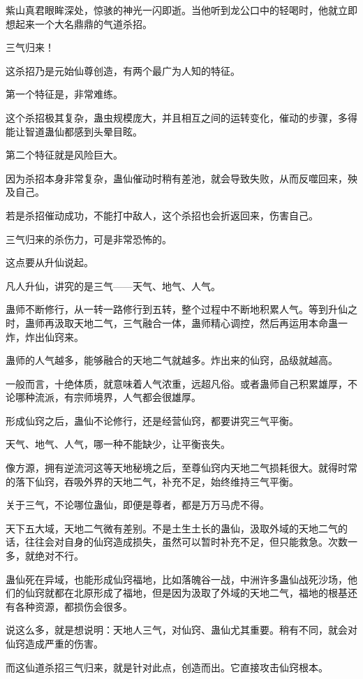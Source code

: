 \begin{this_body}
紫山真君眼眸深处，惊骇的神光一闪即逝。当他听到龙公口中的轻喝时，他就立即想起来一个大名鼎鼎的气道杀招。

三气归来！

这杀招乃是元始仙尊创造，有两个最广为人知的特征。

第一个特征是，非常难练。

这个杀招极其复杂，蛊虫规模庞大，并且相互之间的运转变化，催动的步骤，多得能让智道蛊仙都感到头晕目眩。

第二个特征就是风险巨大。

因为杀招本身非常复杂，蛊仙催动时稍有差池，就会导致失败，从而反噬回来，殃及自己。

若是杀招催动成功，不能打中敌人，这个杀招也会折返回来，伤害自己。

三气归来的杀伤力，可是非常恐怖的。

这点要从升仙说起。

凡人升仙，讲究的是三气——天气、地气、人气。

蛊师不断修行，从一转一路修行到五转，整个过程中不断地积累人气。等到升仙之时，蛊师再汲取天地二气，三气融合一体，蛊师精心调控，然后再运用本命蛊一炸，炸出仙窍来。

蛊师的人气越多，能够融合的天地二气就越多。炸出来的仙窍，品级就越高。

一般而言，十绝体质，就意味着人气浓重，远超凡俗。或者蛊师自己积累雄厚，不论哪种流派，有宗师境界，人气都会很雄厚。

形成仙窍之后，蛊仙不论修行，还是经营仙窍，都要讲究三气平衡。

天气、地气、人气，哪一种不能缺少，让平衡丧失。

像方源，拥有逆流河这等天地秘境之后，至尊仙窍内天地二气损耗很大。就得时常的落下仙窍，吞吸外界的天地二气，补充不足，始终维持三气平衡。

关于三气，不论哪位蛊仙，即便是尊者，都是万万马虎不得。

天下五大域，天地二气微有差别。不是土生土长的蛊仙，汲取外域的天地二气的话，往往会对自身的仙窍造成损失，虽然可以暂时补充不足，但只能救急。次数一多，就绝对不行。

蛊仙死在异域，也能形成仙窍福地，比如落魄谷一战，中洲许多蛊仙战死沙场，他们的仙窍就都在北原形成了福地，但是因为汲取了外域的天地二气，福地的根基还有各种资源，都损伤会很多。

说这么多，就是想说明：天地人三气，对仙窍、蛊仙尤其重要。稍有不同，就会对仙窍造成严重的伤害。

而这仙道杀招三气归来，就是针对此点，创造而出。它直接攻击仙窍根本。


\end{this_body}
